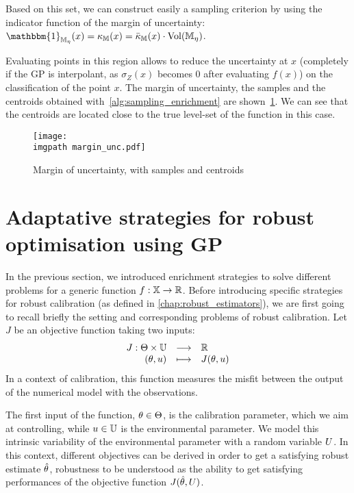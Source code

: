\documentclass[../../Main_ManuscritThese.tex]{subfiles}
\newcommand\imgpath{/home/victor/acadwriting/Manuscrit/Text/Chapter4/img/}
\begin{document}
Based on this set, we can construct easily a sampling criterion by using the indicator function of the margin of uncertainty: $\mathbbm{1}_{\mathbb{M}_{\eta}}(x)=\kappa_{\mathbb{M}}(x) = \bar{\kappa}_{\mathbb{M}}(x) \cdot \mathrm{Vol}(\mathbb{M}_{\eta})$.

Evaluating points in this region allows to reduce the uncertainty at $x$ (completely if the GP is interpolant, as $\sigma_Z(x)$ becomes $0$ after evaluating $f(x)$) on the classification of the point $x$.
The margin of uncertainty, the samples and the centroids obtained with~\cref{alg:sampling_enrichment} are shown~\cref{fig:margin_unc}. We can see that the centroids are located close to the true level-set of the function in this case.
\begin{figure}[ht]
  \centering
  \texttt{[image: \\imgpath margin\_unc.pdf]}
  \caption{\label{fig:margin_unc} Margin of uncertainty, with samples and centroids}
\end{figure}

\section{Adaptative strategies for robust optimisation using GP}
\label{sec:robust_criteria_gp}
In the previous section, we introduced enrichment strategies to solve different problems for a generic function $f:\mathbb{X}\rightarrow \mathbb{R}$.
Before introducing specific strategies for robust calibration (as defined in \cref{chap:robust_estimators}), we are first going to recall briefly the setting and corresponding problems of robust calibration.
Let $J$ be an objective function taking two inputs:
\begin{equation}
  \begin{array}{rcl}
    J: \Theta \times \mathbb{U}& \longrightarrow& \mathbb{R} \\
    (\theta, u) & \longmapsto & J(\theta, u)
  \end{array}
\end{equation}
In a context of calibration, this function measures the misfit between the output of the numerical model with the observations.

The first input of the function, $\theta\in\Theta$, is the calibration parameter, which we aim at controlling, while $u\in\mathbb{U}$ is the environmental parameter. We model this intrinsic variability of the environmental parameter with a random variable $U$.
In this context, different objectives can be derived in order to get a satisfying robust estimate $\hat{\theta}$, robustness to be understood as the ability to get satisfying performances of the objective function $J(\hat{\theta},U)$.
\end{document}
